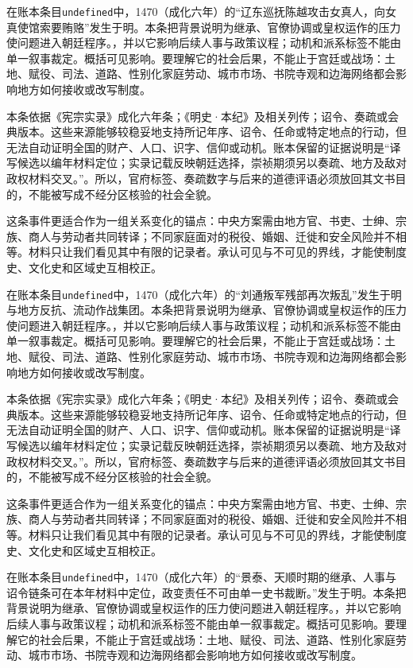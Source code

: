 在账本条目\texttt{undefined}中，1470（成化六年）的“辽东巡抚陈越攻击女真人，向女真使馆索要贿赂”发生于明。本条把背景说明为继承、官僚协调或皇权运作的压力使问题进入朝廷程序。，并以它影响后续人事与政策议程；动机和派系标签不能由单一叙事裁定。概括可见影响。要理解它的社会后果，不能止于宫廷或战场：土地、赋役、司法、道路、性别化家庭劳动、城市市场、书院寺观和边海网络都会影响地方如何接收或改写制度。

本条依据《宪宗实录》成化六年条；《明史·本纪》及相关列传；诏令、奏疏或会典版本。这些来源能够较稳妥地支持所记年序、诏令、任命或特定地点的行动，但无法自动证明全国的财产、人口、识字、信仰或动机。账本保留的证据说明是“译写候选以编年材料定位；实录记载反映朝廷选择，崇祯期须另以奏疏、地方及敌对政权材料交叉。”。所以，官府标签、奏疏数字与后来的道德评语必须放回其文书目的，不能被写成不经分区核验的社会全貌。

这条事件更适合作为一组关系变化的锚点：中央方案需由地方官、书吏、士绅、宗族、商人与劳动者共同转译；不同家庭面对的税役、婚姻、迁徙和安全风险并不相等。材料只让我们看见其中有限的记录者。承认可见与不可见的界线，才能使制度史、文化史和区域史互相校正。

在账本条目\texttt{undefined}中，1470（成化六年）的“刘通叛军残部再次叛乱”发生于明与地方反抗、流动作战集团。本条把背景说明为继承、官僚协调或皇权运作的压力使问题进入朝廷程序。，并以它影响后续人事与政策议程；动机和派系标签不能由单一叙事裁定。概括可见影响。要理解它的社会后果，不能止于宫廷或战场：土地、赋役、司法、道路、性别化家庭劳动、城市市场、书院寺观和边海网络都会影响地方如何接收或改写制度。

本条依据《宪宗实录》成化六年条；《明史·本纪》及相关列传；诏令、奏疏或会典版本。这些来源能够较稳妥地支持所记年序、诏令、任命或特定地点的行动，但无法自动证明全国的财产、人口、识字、信仰或动机。账本保留的证据说明是“译写候选以编年材料定位；实录记载反映朝廷选择，崇祯期须另以奏疏、地方及敌对政权材料交叉。”。所以，官府标签、奏疏数字与后来的道德评语必须放回其文书目的，不能被写成不经分区核验的社会全貌。

这条事件更适合作为一组关系变化的锚点：中央方案需由地方官、书吏、士绅、宗族、商人与劳动者共同转译；不同家庭面对的税役、婚姻、迁徙和安全风险并不相等。材料只让我们看见其中有限的记录者。承认可见与不可见的界线，才能使制度史、文化史和区域史互相校正。

在账本条目\texttt{undefined}中，1470（成化六年）的“景泰、天顺时期的继承、人事与诏令链条可在本年材料中定位，政变责任不可由单一史书裁断。”发生于明。本条把背景说明为继承、官僚协调或皇权运作的压力使问题进入朝廷程序。，并以它影响后续人事与政策议程；动机和派系标签不能由单一叙事裁定。概括可见影响。要理解它的社会后果，不能止于宫廷或战场：土地、赋役、司法、道路、性别化家庭劳动、城市市场、书院寺观和边海网络都会影响地方如何接收或改写制度。

